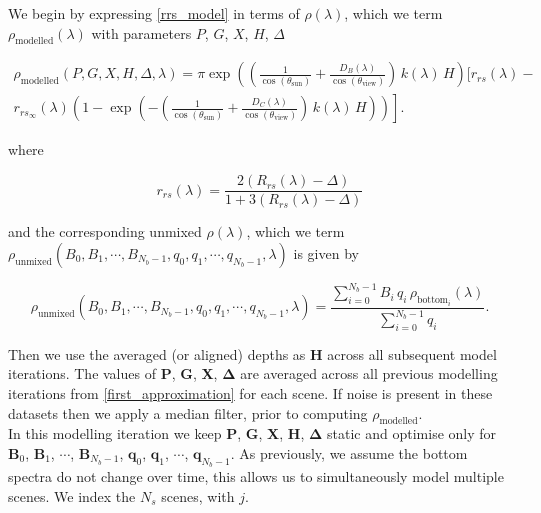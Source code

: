 \documentclass[12pt]{article}
\numberwithin{equation}{section}
\begin{document}
We begin by expressing \ref{rrs_model} in terms of $\rho(\lambda)$, which we 
term $\rho_{\text{modelled}}(\lambda)$ with parameters $P$, $G$, $X$, $H$, $\Delta$
\begin{linenomath}
\begin{multline*}
\rho_{\text{modelled}}(P, G, X, H, \Delta, \lambda) = \pi \exp\left(\left(\frac{1}{\cos(\theta_{\text{sun}})} + \frac{D_B(\lambda)}{\cos(\theta_{\text{view}})}\right)\,k(\lambda)\,H\right) \bigg[r_{rs}(\lambda) - \\
\left. r_{rs_{\infty}}(\lambda) \left(1 - \exp\left(-\left(\frac{1}{\cos(\theta_{\text{sun}})} + \frac{D_C(\lambda)}{\cos(\theta_{\text{view}})}\right)\,k(\lambda)\,H\right)\right) \right].
\end{multline*}
\end{linenomath}
where
\begin{linenomath}
\begin{equation*}
r_{rs}(\lambda) = \frac{2(R_{rs}(\lambda) - \Delta)}{1 + 3(R_{rs}(\lambda) - \Delta)}
\end{equation*}
\end{linenomath}
and the corresponding unmixed $\rho(\lambda)$, which we term 
$\rho_{\text{unmixed}}(B_0, B_1, \cdots, B_{N_b-1}, q_0, q_1, \cdots, q_{N_b-1},\lambda)$ is given by 
\begin{linenomath}
\begin{equation*}
\rho_{\text{unmixed}}(B_0, B_1, \cdots, B_{N_b-1}, q_0, q_1, \cdots, q_{N_b-1}, \lambda) = \frac{\sum\limits_{i=0}^{N_b-1}B_i\,q_i\,\rho_{\text{bottom}_i}(\lambda)}{\sum\limits_{i=0}^{N_b-1}q_i}.
\end{equation*}
\end{linenomath}
Then we use the averaged (or aligned) depths as \textbf{H} across all subsequent model iterations. The 
values of \textbf{P}, \textbf{G}, \textbf{X}, $\mathbf{\Delta}$ are averaged across all previous 
modelling iterations from \ref{first_approximation} for each scene. If noise is present in these datasets 
then we apply a median filter, prior to computing $\rho_{\text{modelled}}$. \\

In this modelling iteration we keep \textbf{P}, \textbf{G}, \textbf{X}, \textbf{H}, $\mathbf{\Delta}$ 
static and optimise only for $\textbf{B}_0$, $\textbf{B}_1$, $\cdots$, $\textbf{B}_{N_b-1}$, 
$\textbf{q}_0$, $\textbf{q}_1$, $\cdots$, $\textbf{q}_{N_b-1}$. As previously, we assume the bottom 
spectra do not change over time, this allows us to simultaneously model multiple scenes. We index 
the $N_s$ scenes, with $j$. \\ 
\end{document}
